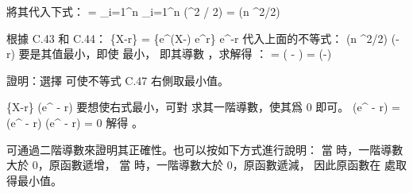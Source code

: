 將其代入下式：
\startformula\startmathalignment
\NC \E[e^{\alpha(X - \mu)}]
    \NC = \prod_{i=1}^n \E[e^{\alpha(X_i - p_i)}] \NR
\NC \NC \le \prod_{i=1}^n \exp(\alpha^2 / 2) \NR
\NC \NC = \exp(n \alpha^2/2) \NR
\stopmathalignment\stopformula

根據 C.43 和 C.44：
\startformula\startmathalignment
\NC \Pr\{X-\mu\ge r\}
    \NC = \Pr\{e^{\alpha(X-\mu)} \ge e^{\alpha r}\} \NR
\NC \NC \le \E[e^{\alpha(X-\mu)}] e^{-\alpha r} \NR
\startintertext
代入上面的不等式：
\stopintertext
\NC \NC \le \exp({n \alpha^2/2}) \exp({-\alpha r}) \NR
\startintertext
要是其值最小，即使  最小，
即其導數 ，求解得 ：
\stopintertext
\NC \NC = \exp({ - }) \NR
\NC \NC = \exp(-) \NR
\stopmathalignment\stopformula
\stopANSWER

\startEXERCISE\DIFFICULT
證明：選擇  可使不等式 C.47 右側取最小值。
\stopEXERCISE

\startANSWER
\startformula
\Pr\{X-\mu\ge r\} \le \exp(\mu e^{\alpha} - \alpha r)
\stopformula
要想使右式最小，可對 \m{\alpha} 求其一階導數，使其爲 0 即可。
\startformula
{}\exp(\mu e^{\alpha} - \alpha r)
  = (\mu e^{\alpha} - r) \exp(\mu e^{\alpha} - \alpha r)
  = 0
\stopformula
解得 。

可通過二階導數來證明其正確性。也可以按如下方式進行說明：
當  時，一階導數大於 0，原函數遞增，
當  時，一階導數大於 0，原函數遞減，
因此原函數在  處取得最小值。
\stopANSWER

\stopsection
